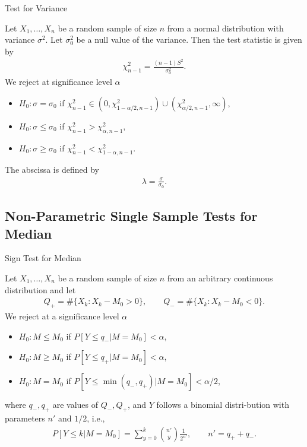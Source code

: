 \begin{frame}{Test for Variance}

\justifying
{} Let $X_1, \ldots, X_n$ be a random sample of size $n$ from a normal distribution with  variance $\sigma^2$. Let $\sigma^2_0$ be a null value of the variance. Then the test statistic is given by
\begin{align*}
\chi_{n-1}^2 = \frac{(n-1)S^2}{\sigma_0^2}.
\end{align*}
We reject at significance level $\alpha$
\begin{itemize}
	\item $H_0: \sigma = \sigma_0$ if $\chi_{n-1}^2 \in (0, \chi_{1-\alpha/2, n-1}^2) \cup (\chi_{\alpha/2, n-1}^2, \infty)$,
	\item $H_0: \sigma\leq \sigma_0$ if $\chi_{n-1}^2 > \chi_{\alpha, n-1}^2$,
	\item $H_0: \sigma\geq \sigma_0$ if $\chi_{n-1}^2 < \chi_{1-\alpha, n-1}^2$.
\end{itemize}
 The abscissa is defined by
\begin{align*}
\lambda = \frac{\sigma}{\sigma_0}.
\end{align*}

\end{frame}


\subsection{Non-Parametric Single Sample Tests for Median}

\begin{frame}{Sign Test for Median}

\justifying
{} Let $X_1, \ldots, X_n$ be a random sample of size $n$ from an arbitrary continuous distribution and let 
\begin{align*}
Q_{+} = \#\{X_k: X_k - M_0 > 0\}, \qquad Q_{-} = \#\{X_k: X_k - M_0 < 0\}.
\end{align*}
We reject at a significance level $\alpha$
\begin{itemize}
	\justifying
	\item $H_0: M\leq M_0$ if $P[Y\leq q_-|M = M_0] < \alpha$,
	\item $H_0: M\geq M_0$ if $P[Y\leq q_+|M = M_0] < \alpha$,
	\item $H_0: M = M_0$ if $P[Y\leq \min(q_-, q_+)|M = M_0] < \alpha/2$,
\end{itemize}
where $q_-, q_+$ are values of $Q_-, Q_+$, and $Y$ follows a binomial distri-bution with parameters $n'$ and $1/2$, i.e.,
\begin{align*}
P[Y \leq k|M = M_0] = \sum_{y=0}^k \binom{n'}{y} \frac{1}{2^{n'}}, \qquad n' = q_+ + q_-.
\end{align*}

\end{frame}


